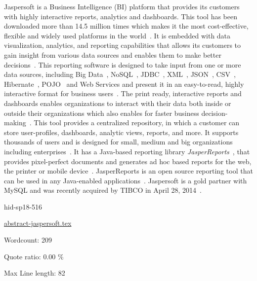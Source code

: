Jaspersoft is a Business Intelligence (BI) platform that provides its
customers with highly interactive reports, analytics and dashboards. This tool
has been downloaded more than 14.5 million times which makes it the most
cost-effective, flexible and widely used platforms in the 
world~\cite{hid-sp18-516-www-finances-online}. It is embedded with data 
visualization, analytics, and reporting capabilities that allows its
customers to gain insight from various data sources and enables them to make
better decisions~\cite{hid-sp18-516-www-finances-online}. This reporting
software is designed to take input from one or more
data sources, including Big Data~\cite{hid-sp18-516-www-wiki-bigdata}, 
NoSQL~\cite{hid-sp18-516-www-wiki-nosql}, JDBC~\cite{hid-sp18-516-www-wiki-jdbc}, 
XML~\cite{hid-sp18-516-www-wiki-xml}, JSON~\cite{hid-sp18-516-www-wiki-json}, 
CSV~\cite{hid-sp18-516-www-wiki-csv}, 
Hibernate~\cite{hid-sp18-516-www-wiki-hibernate}, 
POJO~\cite{hid-sp18-516-www-wiki-pojo} and Web Services and present it in an 
easy-to-read, highly interactive format for business 
users~\cite{hid-sp18-516-www-jaspersoft-overview}. The print ready, interactive 
reports and dashboards enables organizations to interact with their data both 
inside or outside their organizations which also enables for faster business 
decision-making~\cite{hid-sp18-516-www-jaspersoft-overview}. This tool
provides a centralized repository, in which a customer can store user-profiles,
dashboards, analytic views, reports, and more. It supports thousands of users
and is designed for small, medium and big organizations including
enterprises~\cite{hid-sp18-516-www-finances-online}. It has a Java-based
reporting library
\textit{JasperReports}~\cite{hid-sp18-516-www-finances-online}, that provides
pixel-perfect documents and generates ad hoc based reports for the web, the
printer or mobile device~\cite{hid-sp18-516-www-jaspersoft-overview}.
JasperReports is an open source reporting tool that can be
used in any Java-enabled
applications~\cite{hid-sp18-516-www-wiki-jasperreports}. Jaspersoft is a gold
partner with MySQL and was recently acquired by TIBCO in April 28,
2014~\cite{hid-sp18-516-www-wiki-jasperreports}.


\begin{IU}

hid-sp18-516

\href{https://github.com/cloudmesh-community/hid-sp18-516/blob/master//technology/abstract-jaspersoft.tex}{abstract-jaspersoft.tex}

 

Wordcount: 209


Quote ratio: 0.00 \%
 
Max Line length: 82
\end{IU}

